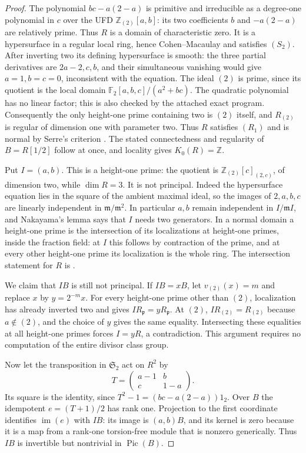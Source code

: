 \begin{proof}
The polynomial $bc-a(2-a)$ is primitive and irreducible as a degree-one
polynomial in $c$ over the UFD $\mathbb Z_{(2)}[a,b]$: its two coefficients
$b$ and $-a(2-a)$ are relatively prime. Thus $R$ is a domain of
characteristic zero. It is a hypersurface in a regular local ring, hence
Cohen--Macaulay and satisfies $(S_2)$. After inverting two its defining
hypersurface is smooth: the three partial derivatives are $2a-2,c,b$,
and their simultaneous vanishing would give $a=1,b=c=0$, inconsistent
with the equation. The ideal $(2)$ is prime, since its quotient is the
local domain $\mathbb F_2[a,b,c]/(a^2+bc)$. The quadratic polynomial has
no linear factor; this is also checked by the attached exact program.
Consequently the only height-one prime containing two is $(2)$ itself,
and $R_{(2)}$ is regular of dimension one with parameter two. Thus $R$
satisfies $(R_1)$ and is normal by Serre's criterion
\cite[Tag 031S]{C-StacksNormal}. The stated connectedness and regularity of
$B=R[1/2]$ follow at once, and locality gives $K_0(R)=\mathbb Z$.

Put $I=(a,b)$. This is a height-one prime: the quotient is
$\mathbb Z_{(2)}[c]_{(2,c)}$, of dimension two, while $\dim R=3$.
It is not principal. Indeed the hypersurface equation lies in the square
of the ambient maximal ideal, so the images of $2,a,b,c$ are linearly
independent in $\mathfrak m/\mathfrak m^2$. In particular $a,b$ remain
independent in $I/\mathfrak m I$, and Nakayama's lemma says that $I$ needs
two generators. In a normal domain a height-one prime is the intersection
of its localizations at height-one primes, inside the fraction field:
at $I$ this follows by contraction of the prime, and at every other
height-one prime its localization is the whole ring. The intersection
statement for $R$ is \cite[Tag 031T]{C-StacksNormal}.

We claim that $IB$ is still not principal. If $IB=xB$, let $v_{(2)}(x)=m$
and replace $x$ by $y=2^{-m}x$. For every height-one prime other than $(2)$,
localization has already inverted two and gives $I R_{\mathfrak p}=y
R_{\mathfrak p}$. At $(2)$, $I R_{(2)}=R_{(2)}$ because $a\notin(2)$,
and the choice of $y$ gives the same equality. Intersecting these equalities
at all height-one primes forces $I=yR$, a contradiction. This argument
requires no computation of the entire divisor class group.

Now let the transposition in $\mathfrak S_2$ act on $R^2$ by
\[
 T=\begin{pmatrix}a-1&b\\c&1-a\end{pmatrix}.
\]
Its square is the identity, since $T^2-1=(bc-a(2-a))1_2$.
Over $B$ the idempotent $e=(T+1)/2$ has rank one. Projection to the first
coordinate identifies $\operatorname{im}(e)$ with $IB$: its image is
$(a,b)B$, and its kernel is zero because it is a map from a rank-one
torsion-free module that is nonzero generically. Thus $IB$ is invertible
but nontrivial in $\operatorname{Pic}(B)$.


\end{proof}
